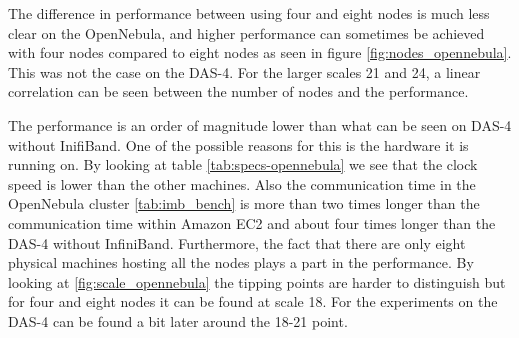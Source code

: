 The difference in performance between using four and eight nodes is much less clear on the OpenNebula, and higher performance can sometimes be achieved with four nodes compared to eight nodes as seen in figure \ref{fig:nodes_opennebula}. This was not the case on the DAS-4.
For the larger scales 21 and 24, a linear correlation can be seen between the number of nodes and the performance.

The performance is an order of magnitude lower than what can be seen on DAS-4 without InifiBand. One of the possible reasons for this is the hardware it is running on. By looking at table \ref{tab:specs-opennebula} we see that the clock speed is lower than the other machines. Also the communication time in the OpenNebula cluster \ref{tab:imb_bench} is more than two times longer than the communication time within Amazon EC2 and about four times longer than the DAS-4 without InfiniBand. Furthermore, the fact that there are only eight physical machines hosting all the nodes plays a part in the performance. By looking at \ref{fig:scale_opennebula} the tipping points are harder to distinguish but for four and eight nodes it can be found at scale 18. For the experiments on the DAS-4 can be found a bit later around the 18-21 point.

